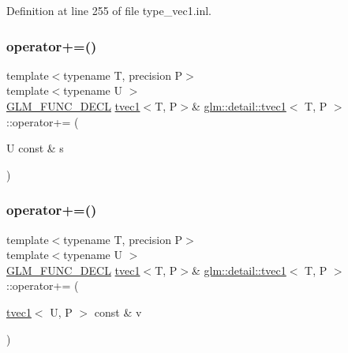 Definition at line 255 of file type\+\_\+vec1.\+inl.

\mbox{\label{structglm_1_1detail_1_1tvec1_a6ae40e6821e60a9018d1eb8a1cca3da9}} 
\subsubsection{\texorpdfstring{operator+=()}{operator+=()}\hspace{0.1cm}{\footnotesize\ttfamily [1/4]}}
{\footnotesize\ttfamily template$<$typename T, precision P$>$ \\
template$<$typename U $>$ \\
\hyperlink{setup_8hpp_ab2d052de21a70539923e9bcbf6e83a51}{G\+L\+M\+\_\+\+F\+U\+N\+C\+\_\+\+D\+E\+CL} \hyperlink{structglm_1_1detail_1_1tvec1}{tvec1}$<$T, P$>$\& \hyperlink{structglm_1_1detail_1_1tvec1}{glm\+::detail\+::tvec1}$<$ T, P $>$\+::operator+= (\begin{DoxyParamCaption}\item[{U const \&}]{s }\end{DoxyParamCaption})}

\mbox{\label{structglm_1_1detail_1_1tvec1_af5d7976948734a9a514d87d8508ea2ac}} 
\subsubsection{\texorpdfstring{operator+=()}{operator+=()}\hspace{0.1cm}{\footnotesize\ttfamily [2/4]}}
{\footnotesize\ttfamily template$<$typename T, precision P$>$ \\
template$<$typename U $>$ \\
\hyperlink{setup_8hpp_ab2d052de21a70539923e9bcbf6e83a51}{G\+L\+M\+\_\+\+F\+U\+N\+C\+\_\+\+D\+E\+CL} \hyperlink{structglm_1_1detail_1_1tvec1}{tvec1}$<$T, P$>$\& \hyperlink{structglm_1_1detail_1_1tvec1}{glm\+::detail\+::tvec1}$<$ T, P $>$\+::operator+= (\begin{DoxyParamCaption}\item[{\hyperlink{structglm_1_1detail_1_1tvec1}{tvec1}$<$ U, P $>$ const \&}]{v }\end{DoxyParamCaption})}

